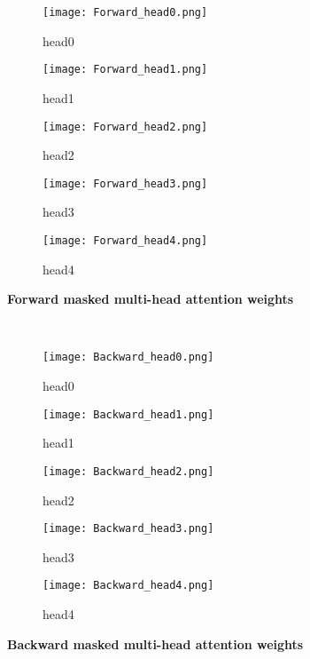 \documentclass[11pt,letterpaper]{article}
\begin{document}
\begin{figure}[h]
\centering
\begin{subfigure}{.25\textwidth}
  \centering
  \texttt{[image: Forward\_head0.png]}
  \caption{head0}
  \label{forward_head0}
\end{subfigure}\begin{subfigure}{.25\textwidth}
  \centering
  \texttt{[image: Forward\_head1.png]}
  \caption{head1}
  \label{forward_head1}
\end{subfigure}
\begin{subfigure}{.25\textwidth}
  \centering
  \texttt{[image: Forward\_head2.png]}
  \caption{head2}
  \label{forward_head2}
\end{subfigure}\begin{subfigure}{.25\textwidth}
  \centering
  \texttt{[image: Forward\_head3.png]}
  \caption{head3}
  \label{forward_head3}
\end{subfigure}
\begin{subfigure}{.25\textwidth}
  \centering
  \texttt{[image: Forward\_head4.png]}
  \caption{head4}
  \label{forward_head4}
\end{subfigure}
\caption{\textbf{Forward masked multi-head attention weights}}
\label{forward_head}
\end{figure}

\newpage
\
\begin{figure}[t!]
\centering
\begin{subfigure}{.25\textwidth}
  \centering
  \texttt{[image: Backward\_head0.png]}
  \caption{head0}
  \label{backward_head0}
\end{subfigure}\begin{subfigure}{.25\textwidth}
  \centering
  \texttt{[image: Backward\_head1.png]}
  \caption{head1}
  \label{backward_head1}
\end{subfigure}
\begin{subfigure}{.25\textwidth}
  \centering
  \texttt{[image: Backward\_head2.png]}
  \caption{head2}
  \label{backward_head2}
\end{subfigure}\begin{subfigure}{.25\textwidth}
  \centering
  \texttt{[image: Backward\_head3.png]}
  \caption{head3}
  \label{backward_head3}
\end{subfigure}
\begin{subfigure}{.25\textwidth}
  \centering
  \texttt{[image: Backward\_head4.png]}
  \caption{head4}
  \label{backward_head4}
\end{subfigure}
\caption{\textbf{Backward masked multi-head attention weights}}
\label{backward_head}
\end{figure}
\end{document}
